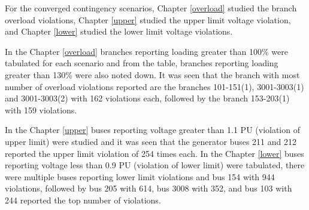 \documentclass[10pt]{report}
\begin{document}
\begin{table}[H]
\caption{Count of scenarios for which tested contingency failed to converge}
\label{count_blown}
\centering
{}
\end{table}

For the converged contingency scenarios, Chapter \ref{overload} studied the branch overload violations, Chapter \ref{upper} studied the upper limit voltage violation, and Chapter \ref{lower} studied the lower limit voltage violations. 

In the Chapter \ref{overload} branches reporting loading greater than 100\% were tabulated for each scenario and from the table, branches reporting loading greater than 130\% were also noted down. It was seen that the branch with most number of overload violations reported are the branches 101-151(1), 3001-3003(1) and 3001-3003(2) with 162 violations each, followed by the branch 153-203(1) with 159 violations. 

In the Chapter \ref{upper} buses reporting voltage greater than 1.1 PU (violation of upper limit) were studied and it was seen that the generator buses 211 and 212 reported the upper limit violation of 254 times each. In the Chapter \ref{lower} buses reporting voltage less than 0.9 PU (violation of lower limit) were tabulated, there were multiple buses reporting lower limit violations and bus 154 with 944 violations, followed by bus 205 with 614, bus 3008 with 352, and bus 103 with 244 reported the top number of violations.
\end{document}
